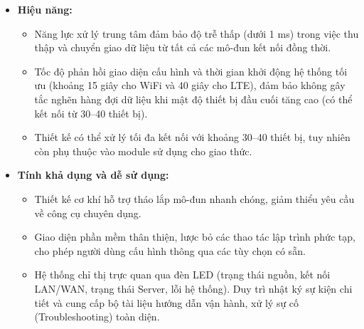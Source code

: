 \begin{itemize}
        \item \textbf{Hiệu năng:}
        \begin{itemize}
            \item Năng lực xử lý trung tâm đảm bảo độ trễ thấp (dưới 1 ms) trong việc thu thập và chuyển giao dữ liệu từ tất cả các mô-đun kết nối đồng thời.
            \item Tốc độ phản hồi giao diện cấu hình và thời gian khởi động hệ thống tối ưu (khoảng 15 giây cho WiFi và 40 giây cho LTE), đảm bảo không gây tắc nghẽn hàng đợi dữ liệu khi mật độ thiết bị đầu cuối tăng cao (có thể kết nối từ 30--40 thiết bị).
            \item Thiết kế có thể xử lý tối đa kết nối với khoảng 30--40 thiết bị, tuy nhiên còn phụ thuộc vào module sử dụng cho giao thức.
        \end{itemize}
        
        \item \textbf{Tính khả dụng và dễ sử dụng:}
        \begin{itemize}
            \item Thiết kế cơ khí hỗ trợ tháo lắp mô-đun nhanh chóng, giảm thiểu yêu cầu về công cụ chuyên dụng.
            \item Giao diện phần mềm thân thiện, lược bỏ các thao tác lập trình phức tạp, cho phép người dùng cấu hình thông qua các tùy chọn có sẵn.
            \item Hệ thống chỉ thị trực quan qua đèn LED (trạng thái nguồn, kết nối LAN/WAN, trạng thái Server, lỗi hệ thống). Duy trì nhật ký sự kiện chi tiết và cung cấp bộ tài liệu hướng dẫn vận hành, xử lý sự cố (Troubleshooting) toàn diện.
        \end{itemize}
    \end{itemize}